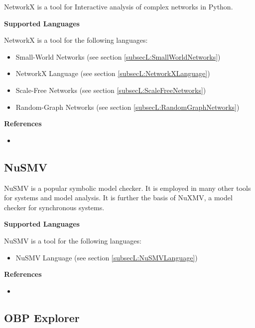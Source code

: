 NetworkX is a tool for Interactive analysis of complex networks in Python.

\textbf{Supported Languages}

NetworkX is a tool for the following languages:
\begin{itemize}
	\item Small-World Networks (see section \ref{subsecL:SmallWorldNetworks})
	\item NetworkX Language (see section \ref{subsecL:NetworkXLanguage})
	\item Scale-Free Networks (see section \ref{subsecL:ScaleFreeNetworks})
	\item Random-Graph Networks (see section \ref{subsecL:RandomGraphNetworks})
\end{itemize}


\textbf{References}
\begin{itemize}
	
\item {}
\end{itemize}



\subsection{NuSMV}
\label{subsecT:NuSMV}


NuSMV is a popular symbolic model checker. It is employed in many other tools for systems and model analysis. It is further the basis of NuXMV, a model checker for synchronous systems.

\textbf{Supported Languages}

NuSMV is a tool for the following languages:
\begin{itemize}
	\item NuSMV Language (see section \ref{subsecL:NuSMVLanguage})
\end{itemize}


\textbf{References}
\begin{itemize}
	
\item {}
\end{itemize}



\subsection{OBP Explorer}
\label{subsecT:OBPExplorer}


